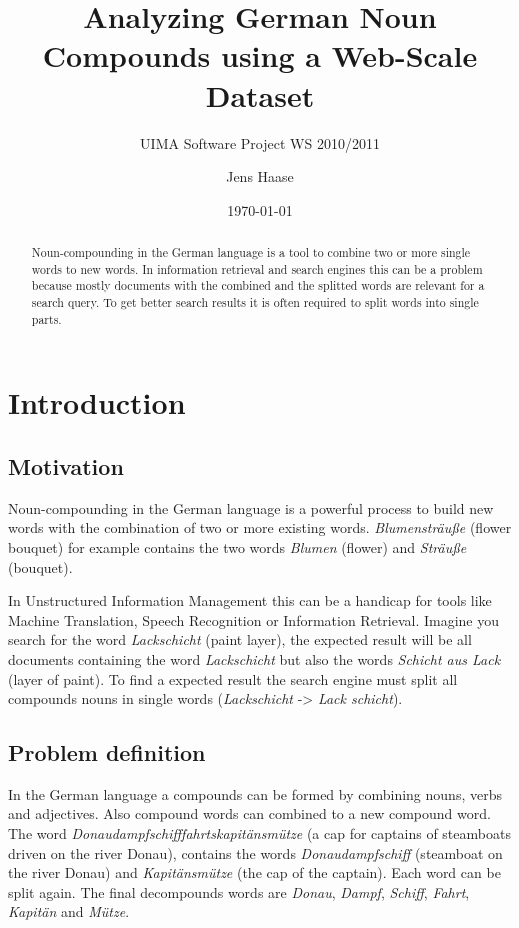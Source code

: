 \documentclass[11pt, accentcolor=tud9b, nochapname]{tudreport}
\begin{document}
\author{Jens Haase}
\title{Analyzing German Noun Compounds using a
  Web-Scale Dataset}
\subtitle{UIMA Software Project WS 2010/2011}
\date{\today}
\maketitle

\begin{abstract}
Noun-compounding in the German language is a tool to combine two or more single words to new words. In information retrieval and search engines this can be a problem because mostly documents with the combined and the splitted words are relevant for a search query. To get better search results it is often required to split words into single parts.
\end{abstract}

\setcounter{tocdepth}{3}
\tableofcontents

\chapter{Introduction}

\section{Motivation}
Noun-compounding in the German language is a powerful process to build
new words with the combination of two or more existing
words. \emph{Blumensträuße} (flower bouquet) for example contains the
two words \emph{Blumen} (flower) and \emph{Sträuße} (bouquet).

In Unstructured Information Management this can be a handicap for
tools like Machine Translation, Speech Recognition or Information
Retrieval. Imagine you search for the word \emph{Lackschicht} (paint
layer), the expected result will be all documents containing the word
\emph{Lackschicht} but also the words \emph{Schicht aus Lack} (layer of
paint). To find a expected result the search engine must split all
compounds nouns in single words (\emph{Lackschicht} -> \emph{Lack schicht}).

\section{Problem definition}
In the German language a compounds can be formed by combining nouns,
verbs and adjectives. Also compound words can combined to a new
compound word. The word \emph{Donaudampfschifffahrtskapitänsmütze} (a
cap for captains of steamboats driven on the river Donau), contains the
words \emph{Donaudampfschiff} (steamboat on the river Donau) and
\emph{Kapitänsmütze} (the cap of the captain). Each word can be
split again. The final decompounds words are \emph{Donau},
\emph{Dampf}, \emph{Schiff}, \emph{Fahrt}, \emph{Kapitän} and
\emph{Mütze}.
\end{document}
